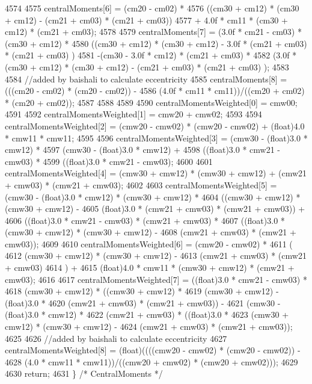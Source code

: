 \begin{DoxyCode}
4574 
4575   centralMoments[6] = (cm20 - cm02) * 
4576                 ((cm30 + cm12) * (cm30 + cm12) - (cm21 + cm03) * (cm21 + cm03))
4577                 + 4.0f * cm11 * (cm30 + cm12) * (cm21 + cm03);
4578 
4579   centralMoments[7] = (3.0f * cm21 - cm03) * (cm30 + cm12) * 
4580                 ((cm30 + cm12) * (cm30 + cm12) - 3.0f * (cm21 + cm03) * (cm21 + cm03) )
4581                -(cm30 - 3.0f * cm12) * (cm21 + cm03) * 
4582                (3.0f * (cm30 + cm12) * (cm30 + cm12) - (cm21 + cm03) * (cm21 + cm03) );
4583 
4584   \textcolor{comment}{//added by baishali to calculate eccentricity}
4585   centralMoments[8] = (((cm20 - cm02) * (cm20 - cm02)) - 
4586                 (4.0f * cm11 * cm11))/((cm20 + cm02) * (cm20 + cm02));
4587 
4588 
4589 
4590   centralMomentsWeighted[0] = cmw00;
4591 
4592   centralMomentsWeighted[1] = cmw20 + cmw02;
4593  
4594   centralMomentsWeighted[2] = (cmw20 - cmw02) * (cmw20 - cmw02) + (float)4.0 * cmw11 * cmw11;
4595 
4596   centralMomentsWeighted[3] = (cmw30 - (float)3.0 * cmw12) * 
4597                 (cmw30 - (float)3.0 * cmw12) + 
4598                 ((float)3.0 * cmw21 - cmw03) * 
4599                 ((float)3.0 * cmw21 - cmw03);
4600 
4601   centralMomentsWeighted[4] = (cmw30 + cmw12) * (cmw30 + cmw12) + (cmw21 + cmw03) * (cmw21 + cmw03);
4602 
4603   centralMomentsWeighted[5] = (cmw30 - (float)3.0 * cmw12) * (cmw30 + cmw12) * 
4604                 ((cmw30 + cmw12) * (cmw30 + cmw12) - 
4605                  (\textcolor{keywordtype}{float})3.0 * (cmw21 + cmw03) * (cmw21 + cmw03)) +
4606                 ((\textcolor{keywordtype}{float})3.0 * cmw21 - cmw03) * (cmw21 + cmw03) * 
4607                 ((float)3.0 * (cmw30 + cmw12) * (cmw30 + cmw12) - 
4608                 (cmw21 + cmw03) * (cmw21 + cmw03));
4609 
4610   centralMomentsWeighted[6] = (cmw20 - cmw02) * 
4611                 (
4612                  (cmw30 + cmw12) * (cmw30 + cmw12) - 
4613                  (cmw21 + cmw03) * (cmw21 + cmw03)
4614                 ) +
4615                 (float)4.0 * cmw11 * (cmw30 + cmw12) * (cmw21 + cmw03);
4616 
4617   centralMomentsWeighted[7] = ((float)3.0 * cmw21 - cmw03) * 
4618                 (cmw30 + cmw12) * ((cmw30 + cmw12) * 
4619                 (cmw30 + cmw12) - (\textcolor{keywordtype}{float})3.0 * 
4620                 (cmw21 + cmw03) * (cmw21 + cmw03)) -
4621                 (cmw30 - (\textcolor{keywordtype}{float})3.0 * cmw12) * 
4622                 (cmw21 + cmw03) * ((float)3.0 * 
4623                 (cmw30 + cmw12) * (cmw30 + cmw12) - 
4624                 (cmw21 + cmw03) * (cmw21 + cmw03));
4625 
4626 \textcolor{comment}{//added by baishali to calculate eccentricity}
4627   centralMomentsWeighted[8] = (float)((((cmw20 - cmw02) * (cmw20 - cmw02)) - 
4628                 (4.0 * cmw11 * cmw11))/((cmw20 + cmw02) * (cmw20 + cmw02)));
4629 
4630   \textcolor{keywordflow}{return};
4631 \}  \textcolor{comment}{/* CentralMoments */}
\end{DoxyCode}
